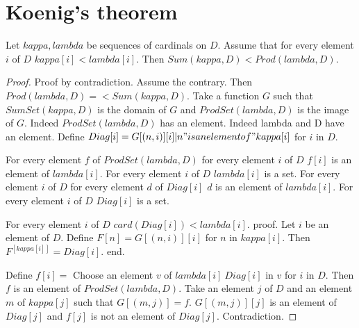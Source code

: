 \documentclass{article}
\begin{document}
  \section*{Koenig's theorem}

  \begin{forthel}
    \begin{theorem}[Koenig]
      Let $kappa, lambda$ be sequences of cardinals on $D$. Assume that for every element $i$ of $D$ $kappa[i] < lambda[i]$. Then $Sum(kappa,D) < Prod(lambda,D)$.
    \end{theorem}
    \begin{proof}
      Proof by contradiction. Assume the contrary. Then $Prod(lambda,D) =<
      Sum(kappa,D)$. Take a function $G$ such that $SumSet(kappa,D)$ is the domain of $G$ and $ProdSet(lambda,D)$ is the image of $G$. Indeed $ProdSet(lambda, D)$ has an element. Indeed lambda and D have an element. Define $Diag[i] = {G[(n,i)][i] | n "is an element of" kappa[i]}$ for $i$ in $D$.

      For every element $f$ of $ProdSet(lambda, D)$ for every element $i$ of $D$ $f[i]$ is an element of $lambda[i]$. For every element $i$ of $D$ $lambda[i]$ is a set. For every element $i$ of $D$ for every element $d$ of $Diag[i]$ $d$ is an element of $lambda[i]$. For every element $i$ of $D$ $Diag[i]$ is a set.
      
      For every element $i$ of $D$ $card(Diag[i]) < lambda[i]$.
      proof.
        Let $i$ be an element of $D$. Define $F[n] = G[(n,i)][i]$ for $n$ in $kappa[i]$. Then $F^[kappa[i]] = Diag[i]$.
      end.

      Define $f[i] =$ Choose an element $v$ of $lambda[i] \ Diag[i]$ in $v$ for $i$ in $D$. Then $f$ is an element of $ProdSet(lambda,D)$. Take an element $j$ of $D$ and an element $m$ of $kappa[j]$ such that $G[(m,j)] = f$. $G[(m,j)][j]$ is an element of $Diag[j]$ and $f[j]$ is not an element of $Diag[j]$. Contradiction.
    \end{proof}
  \end{forthel}
\end{document}
